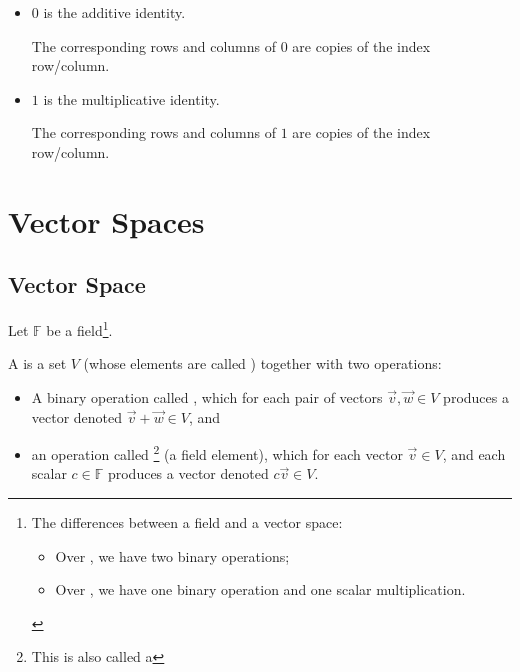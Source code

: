 \documentclass[11pt,fleqn]{book} %
\begin{document}
\begin{example}
\begin{itemize}
\begin{itemize}
            \item $0$ is the additive identity.

            The corresponding rows and columns of $0$ are copies of the index row/column.

            \item $1$ is the multiplicative identity.

            The corresponding rows and columns of $1$ are copies of the index row/column.
        \end{itemize}
    \end{itemize}
\end{example}

\section{Vector Spaces}

\subsection{Vector Space}

Let $\mathbb{F}$ be a field\footnote{The differences between a field and a vector space: \begin{itemize} \item Over , we have two binary operations; \item Over , we have one binary operation and one scalar multiplication. \end{itemize}}.

\setcounter{chapter}{5}
\setcounter{section}{2}
\begin{definition}
    A  is a set $V$ (whose elements are called ) together with two operations:
    \begin{itemize}
        \item A binary operation called , which for each pair of vectors $\overrightarrow{v}, \overrightarrow{w} \in V$ produces a vector denoted $\overrightarrow{v} + \overrightarrow{w} \in V$, and

        \item an operation called \footnote{This is also called a } (a field element), which for each vector $\overrightarrow{v} \in V$, and each scalar $c \in \mathbb{F}$ produces a vector denoted $c\overrightarrow{v}\in V$.
    \end{itemize}
\end{definition}
\setcounter{section}{3}
\setcounter{chapter}{1}
\end{document}
